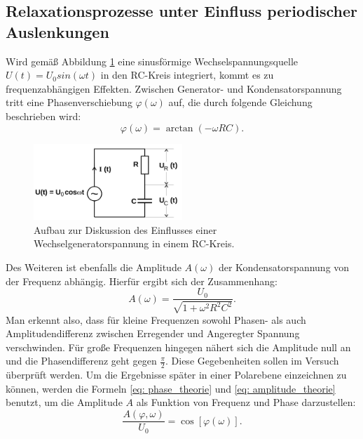 \subsection{Relaxationsprozesse unter Einfluss periodischer Auslenkungen}
Wird gemäß Abbildung \ref{fig: aufbau_2} eine sinusförmige Wechselspannungsquelle $U(t) = U_0sin(\omega t)$ in den RC-Kreis integriert, kommt es zu frequenzabhängigen
Effekten. Zwischen Generator- und Kondensatorspannung tritt eine Phasenverschiebung $\varphi(\omega)$ auf, die durch folgende Gleichung
beschrieben wird:
\begin{equation}
  \varphi(\omega) = \arctan(-\omega RC).
  \label{eq: phase_theorie}
\end{equation}
\FloatBarrier
\begin{figure}
  \centering
\includegraphics[width = 0.5\textwidth]{pics/aufbau_2.png}
\caption{Aufbau zur Diskussion des Einflusses einer Wechselgeneratorspannung in einem RC-Kreis\cite{anleitung353}. }
\label{fig: aufbau_2}
\end{figure}
Des Weiteren ist ebenfalls die Amplitude $A(\omega)$ der Kondensatorspannung von der Frequenz abhängig. Hierfür ergibt sich der Zusammenhang:
\begin{equation}
  A(\omega) = \frac{U_0}{\sqrt{1 +\omega^2R^2C^2}}.
  \label{eq: amplitude_theorie}
\end{equation}
Man erkennt also, dass für kleine Frequenzen sowohl Phasen- als auch Amplitudendifferenz zwischen Erregender und Angeregter Spannung verschwinden.
Für große Frequenzen hingegen nähert sich die Amplitude null an und die Phasendifferenz geht gegen $\frac{\pi}{2}$. Diese Gegebenheiten sollen
im Versuch überprüft werden. Um die Ergebnisse später in einer Polarebene einzeichnen zu können, werden die Formeln \eqref{eq: phase_theorie} und %
\eqref{eq: amplitude_theorie} benutzt, um die Amplitude $A$ als Funktion von Frequenz und Phase darzustellen:
\begin{equation}
\frac{A(\varphi, \omega)}{U_0} = \cos\left[\varphi(\omega)\right].
  \label{eq: amplitude_phase}
\end{equation}

